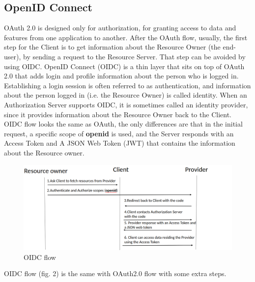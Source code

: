 
\subsection{OpenID Connect}

OAuth 2.0 is designed only for authorization, for granting access to data and features from one application to another. After the OAuth flow, usually, the first step for the Client is to get information about the Resource Owner (the end-user), by sending a request to the Resource Server. That step can be avoided by using OIDC.
OpenID Connect (OIDC) is a thin layer that sits on top of OAuth 2.0 that adds login and profile information about the person who is logged in. Establishing a login session is often referred to as authentication, and information about the person logged in (i.e. the Resource Owner) is called identity. When an Authorization Server supports OIDC, it is sometimes called an identity provider, since it provides information about the Resource Owner back to the Client. OIDC flow looks the same as OAuth, the only differences are that in the initial request, a specific scope of \textbf{openid} is used, and the Server responds with an Access Token and A JSON Web Token (JWT) that contains the information about the Resource owner.

\begin{figure}[htb]
	\centering
	\includegraphics[scale=0.4]{figures/OIDC.png}
	\caption{OIDC flow}
\end{figure}

OIDC flow (fig. 2) is the same with OAuth2.0 flow with some extra steps.

